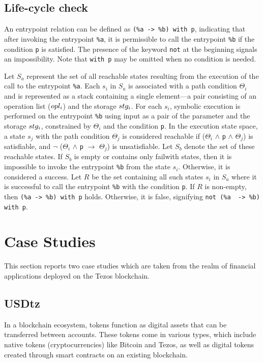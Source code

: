 \documentclass[runningheads]{llncs}
\begin{document}
\subsection{Life-cycle check}
\label{sec:life-cycle-check}
An entrypoint relation can be defined as \lstinline/(%a -> %b) with p/, indicating that after invoking the entrypoint \lstinline/%a/, it is permissible to call the entrypoint \lstinline/%b/ if the condition \lstinline/p/ is satisfied. The presence of the keyword \lstinline/not/ at the beginning signals an impossibility. Note that \lstinline/with p/ may be omitted when no condition is needed.

Let $S_a$ represent the set of all reachable states resulting from the execution of the call to the entrypoint \lstinline/%a/. Each $s_{i}$ in $S_a$ is associated with a path condition $\Theta_i$ and is represented as a stack containing a single element—a pair consisting of an operation list ($opl_i$) and the storage $stg_i$. For each $s_{i}$, symbolic execution is performed on the entrypoint \lstinline/%b/ using input as a pair of the parameter and the storage $stg_i$, constrained by $\Theta_i$ and the condition \lstinline/p/. In the execution state space, a state $s_{j}$ with the path condition $\Theta_j$ is considered reachable if ($\Theta_i$ $\land$ \lstinline/p/ $\land$ $\Theta_j$) is satisfiable, and $\neg$ ($\Theta_i$ $\land$ \lstinline/p/ $\rightarrow$ $\Theta_j$) is unsatisfiable. Let $S_b$ denote the set of these reachable states. If $S_b$ is empty or contains only failwith states, then it is impossible to invoke the entrypoint \lstinline/%b/ from the state $s_{i}$. Otherwise, it is considered a success. Let $R$ be the set containing all such states $s_{i}$ in $S_a$ where it is successful to call the entrypoint \lstinline/%b/ with the condition \lstinline/p/. If $R$ is non-empty, then \lstinline/(%a -> %b) with p/ holds. Otherwise, it is false, signifying \lstinline/not (%a  -> %b) with p/.
\section{Case Studies}
\label{sec:case-stud-subs}

This section reports two case studies which are taken from the realm of financial applications deployed on the Tezos blockchain. 

\subsection{USDtz}
\label{sec:usdtz}
In a blockchain ecosystem, tokens function as digital assets that can be transferred between accounts. These tokens come in various types, which include native tokens (cryptocurrencies) like Bitcoin and Tezos, as well as digital tokens created through smart contracts on an existing blockchain.
\end{document}
